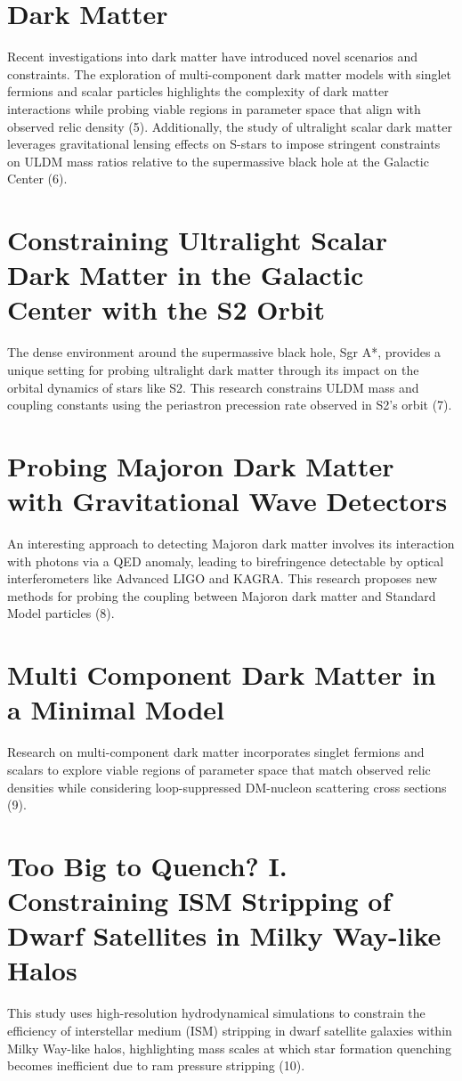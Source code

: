 \documentclass[11pt]{article}
\begin{document}
\section*{Dark Matter}
Recent investigations into dark matter have introduced novel scenarios and constraints. The exploration of multi-component dark matter models with singlet fermions and scalar particles highlights the complexity of dark matter interactions while probing viable regions in parameter space that align with observed relic density (5). Additionally, the study of ultralight scalar dark matter leverages gravitational lensing effects on S-stars to impose stringent constraints on ULDM mass ratios relative to the supermassive black hole at the Galactic Center (6).
\section*{Constraining Ultralight Scalar Dark Matter in the Galactic Center with the S2 Orbit}
The dense environment around the supermassive black hole, Sgr A*, provides a unique setting for probing ultralight dark matter through its impact on the orbital dynamics of stars like S2. This research constrains ULDM mass and coupling constants using the periastron precession rate observed in S2's orbit (7).
\section*{Probing Majoron Dark Matter with Gravitational Wave Detectors}
An interesting approach to detecting Majoron dark matter involves its interaction with photons via a QED anomaly, leading to birefringence detectable by optical interferometers like Advanced LIGO and KAGRA. This research proposes new methods for probing the coupling between Majoron dark matter and Standard Model particles (8).
\section*{Multi Component Dark Matter in a Minimal Model}
Research on multi-component dark matter incorporates singlet fermions and scalars to explore viable regions of parameter space that match observed relic densities while considering loop-suppressed DM-nucleon scattering cross sections (9).
\section*{Too Big to Quench? I. Constraining ISM Stripping of Dwarf Satellites in Milky Way-like Halos}
This study uses high-resolution hydrodynamical simulations to constrain the efficiency of interstellar medium (ISM) stripping in dwarf satellite galaxies within Milky Way-like halos, highlighting mass scales at which star formation quenching becomes inefficient due to ram pressure stripping (10).
\end{document}

